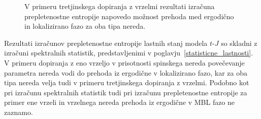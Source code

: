  \begin{figure}[H]
\caption{V primeru tretjinskega dopiranja z vrzelmi rezultati izračuna prepletenostne entropije napovedo možnost prehoda med ergodično in lokalizirano fazo za oba tipa nereda. }
\label{fig:H_ent_entro_density_9_3_3}
\end{figure} 
\noindent
Rezultati izračunov prepletenostne entropije lastnih stanj modela $t$-$J$ so skladni z izračuni spektralnih statistik, predstavljenimi v poglavju~\ref{statisticne_lastnosti}. V primeru dopiranja z eno vrzeljo v prisotnosti spinskega nereda povečevanje parametra nereda vodi do prehoda iz ergodične v lokalizirano fazo, kar za oba tipa nereda velja tudi v primeru tretjinskega dopiranja z vrzelmi. Podobno kot pri izračunu spektralnih statistik tudi pri izračunu prepletenostne entropije za primer ene vrzeli in vrzelnega nereda prehoda iz ergodične v MBL fazo ne zaznamo. 	

